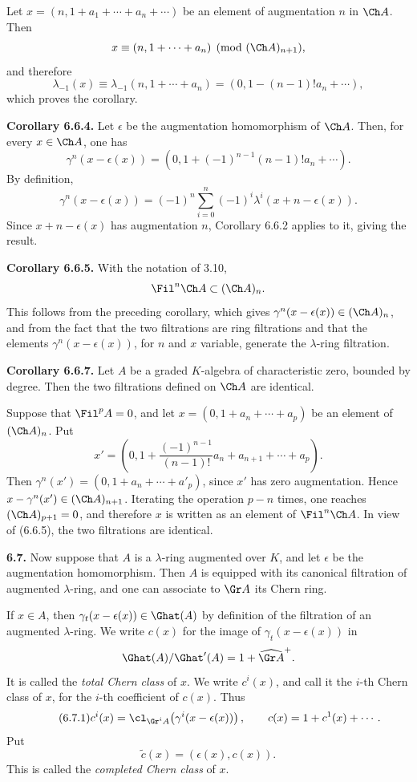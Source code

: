 Let \(x=(n,1+a_1+\cdots+a_n+\cdots)\) be an element of augmentation \(n\) in \(\Ch A\). Then
\[
  x\equiv (n,1+\cdots+a_n)\pmod{(\Ch A)_{n+1}},
\]
and therefore
\[
  \lambda_{-1}(x)\equiv \lambda_{-1}(n,1+\cdots+a_n)
  =(0,1-(n-1)!a_n+\cdots),
\]
which proves the corollary.

\textbf{Corollary 6.6.4.} Let \(\epsilon\) be the augmentation homomorphism of \(\Ch A\). Then, for every \(x\in\Ch A\), one has
\[
  \gamma^n(x-\epsilon(x))
  =
  (0,1+(-1)^{n-1}(n-1)!a_n+\cdots).
\]
By definition,
\[
  \gamma^n(x-\epsilon(x))
  =
  (-1)^n\sum_{i=0}^n(-1)^i\lambda^i(x+n-\epsilon(x)).
\]
Since \(x+n-\epsilon(x)\) has augmentation \(n\), Corollary 6.6.2 applies to it, giving the result.

\textbf{Corollary 6.6.5.} With the notation of 3.10,
\[
  \Fil^n\Ch A\subset(\Ch A)_n.
\]
This follows from the preceding corollary, which gives \(\gamma^n(x-\epsilon(x))\in(\Ch A)_n\), and from the fact that the two filtrations are ring filtrations and that the elements \(\gamma^n(x-\epsilon(x))\), for \(n\) and \(x\) variable, generate the \(\lambda\)-ring filtration.

\textbf{Corollary 6.6.7.} Let \(A\) be a graded \(K\)-algebra of characteristic zero, bounded by degree. Then the two filtrations defined on \(\Ch A\) are identical.

Suppose that \(\Fil^p A=0\), and let \(x=(0,1+a_n+\cdots+a_p)\) be an element of \((\Ch A)_n\). Put
\[
  x'=\left(0,1+\frac{(-1)^{n-1}}{(n-1)!}a_n+a_{n+1}+\cdots+a_p\right).
\]
Then \(\gamma^n(x')=(0,1+a_n+\cdots+a'_p)\), since \(x'\) has zero augmentation. Hence \(x-\gamma^n(x')\in(\Ch A)_{n+1}\). Iterating the operation \(p-n\) times, one reaches \((\Ch A)_{p+1}=0\), and therefore \(x\) is written as an element of \(\Fil^n\Ch A\). In view of (6.6.5), the two filtrations are identical.

\textbf{6.7.} Now suppose that \(A\) is a \(\lambda\)-ring augmented over \(K\), and let \(\epsilon\) be the augmentation homomorphism. Then \(A\) is equipped with its canonical filtration of augmented \(\lambda\)-ring, and one can associate to \(\Gr A\) its Chern ring.

If \(x\in A\), then \(\gamma_t(x-\epsilon(x))\in\Ghat(A)\) by definition of the filtration of an augmented \(\lambda\)-ring. We write \(c(x)\) for the image of \(\gamma_t(x-\epsilon(x))\) in
\[
  \Ghat(A)/\Ghat'(A)=1+\widehat{\Gr A}^{+}.
\]
It is called the \emph{total Chern class} of \(x\). We write \(c^i(x)\), and call it the \(i\)-th Chern class of \(x\), for the \(i\)-th coefficient of \(c(x)\). Thus
\begin{equation}\tag{6.7.1}
  c^i(x)=\cl_{\Gr^iA}\!\left(\gamma^i(x-\epsilon(x))\right),
  \qquad
  c(x)=1+c^1(x)+\cdots .
\end{equation}
Put
\begin{equation}\tag{6.7.2}
  \widetilde c(x)=(\epsilon(x),c(x)).
\end{equation}
This is called the \emph{completed Chern class} of \(x\).

